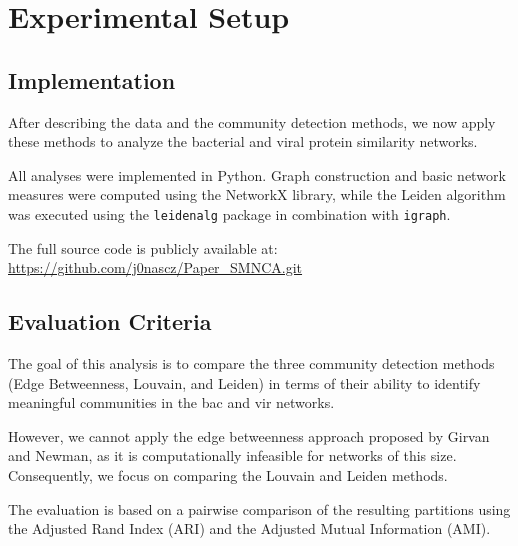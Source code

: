 \section{Experimental Setup}

\subsection{Implementation}

After describing the data and the community detection methods, 
we now apply these methods to analyze the bacterial 
and viral protein similarity networks.

All analyses were implemented in Python. 
Graph construction and basic network measures were computed using the 
NetworkX library, while the Leiden algorithm was executed 
using the \texttt{leidenalg} package in combination with \texttt{igraph}.

The full source code is publicly available at:
\url{https://github.com/j0nascz/Paper_SMNCA.git}

\subsection{Evaluation Criteria}

The goal of this analysis is to compare the three community detection methods
(Edge Betweenness, Louvain, and Leiden) in terms of their ability
to identify meaningful communities in the bac and vir networks.

However, we cannot apply the edge betweenness approach proposed by Girvan and Newman,
as it is computationally infeasible for networks of this size.
Consequently, we focus on comparing the Louvain and Leiden methods.

The evaluation is based on a pairwise comparison of the resulting partitions 
using the Adjusted Rand Index (ARI) and the Adjusted Mutual Information (AMI).